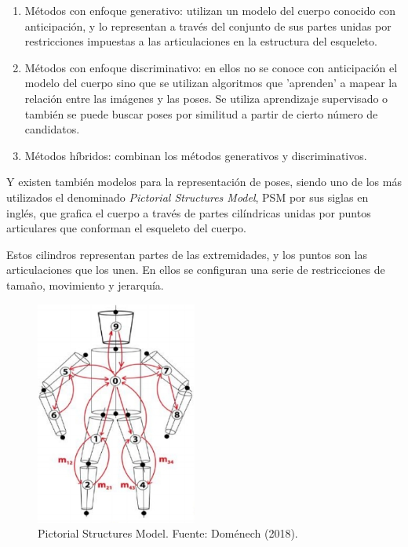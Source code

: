 \documentclass[a4paper,12pt,oneside,spanish]{book}
\begin{document}
\begin{enumerate}
	\baselineskip 16pt
	\item Métodos con enfoque generativo: utilizan un modelo del cuerpo conocido con anticipación, y lo representan a través del conjunto de sus partes unidas por restricciones impuestas a las articulaciones en la estructura del esqueleto.\par
	\item Métodos con enfoque discriminativo: en ellos no se conoce con anticipación el modelo del cuerpo sino que se utilizan algoritmos que 'aprenden' a mapear la relación entre las imágenes y las poses. Se utiliza aprendizaje supervisado o también se puede buscar poses por similitud a partir de cierto número de candidatos.\par
	\item Métodos híbridos: combinan los métodos generativos y discriminativos. \par
\end{enumerate}

Y existen también modelos para la representación de poses, siendo uno de los más utilizados el denominado \textit{Pictorial Structures Model}, PSM por sus siglas en inglés, que grafica el cuerpo a través de partes cilíndricas unidas por puntos articulares que conforman el esqueleto del cuerpo. \par
 
Estos cilindros representan partes de las extremidades, y los puntos son las articulaciones que los unen. En ellos se configuran una serie de restricciones de tamaño, movimiento y jerarquía.

\begin{figure}[h!]
	\includegraphics[width=150pt]{Imagenes/domenech1.jpg}
	\centering
	\caption{Pictorial Structures Model. Fuente: Doménech (2018).}
	\label{fig:domenech2}
\end{figure}
\end{document}
